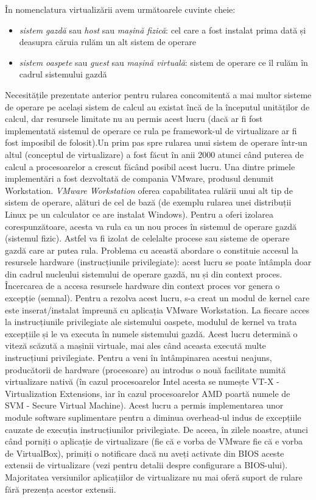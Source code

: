 În nomenclatura virtualizării avem următoarele cuvinte cheie:

\begin{itemize}
	\item \textit{sistem gazdă} sau \textit{host} sau \textit{mașină
		fizică}: cel care a fost instalat prima dată și deasupra căruia
		rulăm un alt sistem de operare
	\item \textit{sistem oaspete} sau \textit{guest} sau \textit{mașină
		virtuală}: sistem de operare ce îl rulăm în cadrul sistemului
		gazdă
\end{itemize}

Necesitățile prezentate anterior pentru rularea concomitentă a mai multor
sisteme de operare pe același sistem de calcul au existat încă de la începutul
unităților de calcul, dar resursele limitate nu au permis acest lucru (dacă ar
fi fost implementată sistemul de operare ce rula pe framework-ul de virtualizare
ar fi fost imposibil de folosit).Un prim pas spre rularea unui sistem de operare
într-un altul (conceptul de virtualizare) a fost făcut în anii 2000 atunci când
puterea de calcul a procesoarelor a crescut făcând posibil acest lucru. Una
dintre primele implementări a fost dezvoltată de compania VMware, produsul
denumit Workstation. \textit{VMware Workstation} oferea capabilitatea rulării
unui alt tip de sistem de operare, alături de cel de bază (de exemplu rularea
unei distribuții Linux pe un calculator ce are instalat Windows). Pentru a oferi
izolarea corespunzătoare, acesta va rula ca un nou proces în sistemul de operare
gazdă (sistemul fizic). Astfel va fi izolat de celelalte procese sau sisteme de
operare gazdă care ar putea rula. Problema cu această abordare o constituie
accesul la resursele hardware (instrucțiunile privilegiate): acest lucru se
poate întâmpla doar din cadrul nucleului sistemului de operare gazdă, nu și din
context proces. Încercarea de a accesa resursele hardware din context proces vor
genera o excepție (semnal). Pentru a rezolva acest lucru, s-a creat un modul de
kernel care este inserat/instalat împreună cu aplicația VMware Workstation. La
fiecare acces la instrucțiunile privilegiate ale sistemului oaspete, modulul de
kernel va trata excepțiile și le va executa în numele sistemului gazdă. Acest
lucru determină o viteză scăzută a mașinii virtuale, mai ales când aceasta
execută multe instrucțiuni privilegiate. Pentru a veni în întâmpinarea acestui
neajuns, producătorii de hardware (procesoare) au introdus o nouă facilitate
numită virtualizare nativă (în cazul procesoarelor Intel acesta se numește VT-X
- Virtualization Extensions, iar în cazul procesoarelor AMD poartă numele de SVM
- Secure Virtual Machine). Acest lucru a permis implementarea unor module
software suplimentare pentru a diminua overhead-ul indus de excepțiile cauzate
de execuția instrucțiunilor privilegiate. De aceea, în zilele noastre, atunci
când porniți o aplicație de virtualizare (fie că e vorba de VMware fie că e
vorba de VirtualBox), primiți o notificare dacă nu aveți activate din BIOS
aceste extensii de virtualizare (vezi 
pentru detalii despre configurare a BIOS-ului). Majoritatea versiunilor
aplicațiilor de virtualizare nu mai oferă suport de rulare fără prezența acestor
extensii.

